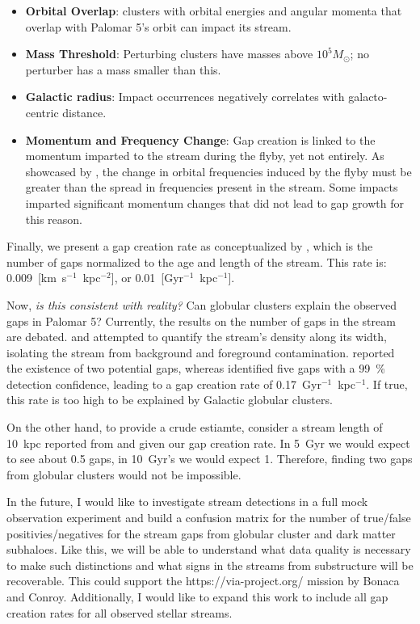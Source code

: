 \documentclass{aa}
\begin{document}
  \begin{itemize}
    \item \textbf{Orbital Overlap}: clusters with orbital energies and angular momenta that overlap with Palomar 5's orbit can impact its stream.
    \item \textbf{Mass Threshold}: Perturbing clusters have masses above $10^5 M_\odot$; no perturber has a mass smaller than this.
    \item \textbf{Galactic radius}: Impact occurrences negatively correlates with galacto-centric distance.
    \item \textbf{Momentum and Frequency Change}: Gap creation is linked to the momentum imparted to the stream during the flyby, yet not entirely. As showcased by \citet{2016MNRAS.457.3817S}, the change in orbital frequencies induced by the flyby must be greater than the spread in frequencies present in the stream. Some impacts imparted significant momentum changes that did not lead to gap growth for this reason.
  \end{itemize}

  Finally, we present a gap creation rate as conceptualized by \citet{2012ApJ...748...20C}, which is the number of gaps normalized to the age and length of the stream. This rate is: 0.009~[km~s$^{-1}$~kpc$^{-2}$], or 0.01~[Gyr$^{-1}$~kpc$^{-1}$].


  Now, \textit{is this consistent with reality?} Can globular clusters explain the observed gaps in Palomar 5? Currently, the results on the number of gaps in the stream are debated. \citet{2012ApJ...760...75C} and \citet{2020ApJ...889...70B} attempted to quantify the stream's density along its width, isolating the stream from background and foreground contamination. \citet{2020ApJ...889...70B} reported the existence of two potential gaps, whereas \citet{2012ApJ...760...75C} identified five gaps with a 99~\% detection confidence, leading to a gap creation rate of 0.17~Gyr$^{-1}$~kpc$^{-1}$. If true, this rate is too high to be explained by Galactic globular clusters.

  On the other hand, to provide a crude estiamte, consider  a stream length of 10~kpc reported from \citet{2020ApJ...889...70B} and given our gap creation rate. In 5~Gyr we would expect to see about 0.5 gaps, in 10~Gyr's we would expect 1. Therefore, finding two gaps from globular clusters would not be impossible.

  In the future, I would like to investigate stream detections in a full mock observation experiment and build a confusion matrix for the number of true/false positivies/negatives for the stream gaps from globular cluster and dark matter subhaloes. Like this, we will be able to understand what data quality is necessary to make such distinctions and what signs in the streams from substructure will be recoverable. This could support the https://via-project.org/ mission by Bonaca and Conroy. Additionally, I would like to expand this work to include all gap creation rates for all observed stellar streams. 
\end{document}
